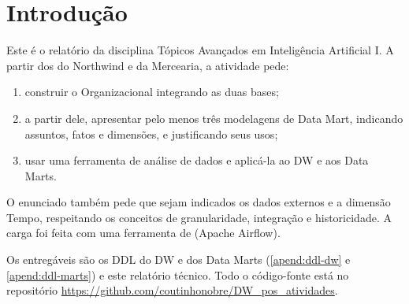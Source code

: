 \chapter{Introdução}
\label{cap:intro}

Este é o relatório da disciplina Tópicos Avançados em Inteligência Artificial I. A partir dos  do Northwind e da Mercearia, a atividade pede:

\begin{enumerate}
    \item construir o  Organizacional integrando as duas bases;
    \item a partir dele, apresentar pelo menos três modelagens de Data Mart, indicando assuntos, fatos e dimensões, e justificando seus usos;
    \item usar uma ferramenta de análise de dados e aplicá-la ao DW e aos Data Marts.
\end{enumerate}

O enunciado também pede que sejam indicados os dados externos e a dimensão Tempo, respeitando os conceitos de granularidade, integração e historicidade. A carga foi feita com uma ferramenta de  (Apache Airflow).

Os entregáveis são os DDL do DW e dos Data Marts (\autoref{apend:ddl-dw} e \autoref{apend:ddl-marts}) e este relatório técnico. Todo o código-fonte está no repositório \url{https://github.com/coutinhonobre/DW_pos_atividades}.
